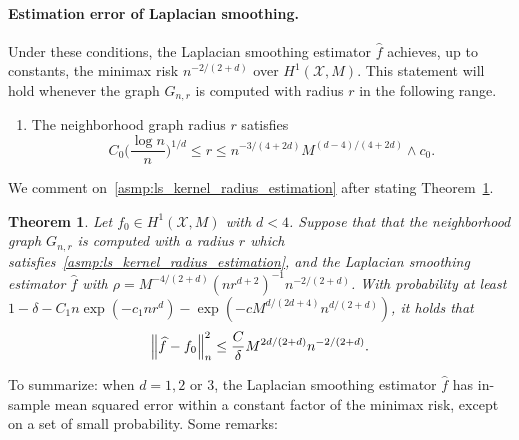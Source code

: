 \documentclass[twoside]{article}
\newcommand{\1}{\mathbf{1}}
\newcommand{\Xset}{\mathcal{X}}
\newcommand{\wh}[1]{\widehat{#1}}
\newtheorem{theorem}{Theorem}
\theoremstyle{definition}
\theoremstyle{remark}
\begin{document}
\paragraph{Estimation error of Laplacian smoothing.} 
Under these conditions, the Laplacian smoothing estimator $\wh{f}$ achieves, up to constants, the minimax risk $n^{-2/(2 + d)}$ over $H^1(\Xset,M)$. This statement will hold whenever the graph $G_{n,r}$ is computed with radius $r$ in the following range.
\begin{enumerate}[label=(R\arabic*)]
	\setcounter{enumi}{0}
	\item 
	\label{asmp:ls_kernel_radius_estimation}
	The neighborhood graph radius $r$ satisfies
	\begin{equation*}
	C_0\biggl(\frac{\log n}{n}\biggr)^{1/d} \leq r \leq n^{-3/(4 + 2d)} M^{(d - 4)/(4 + 2d)} \wedge c_0.
	\end{equation*}
\end{enumerate}
We comment on~\ref{asmp:ls_kernel_radius_estimation} after stating Theorem~\ref{thm:laplacian_smoothing_estimation1}.
\begin{theorem}
	\label{thm:laplacian_smoothing_estimation1}
	Let $f_0 \in H^1(\Xset,M)$ with $d < 4$. Suppose that that the neighborhood graph $G_{n,r}$ is computed with a radius $r$ which satisfies~\ref{asmp:ls_kernel_radius_estimation},  and the Laplacian smoothing estimator $\wh{f}$ with $\rho = M^{-4/(2 + d)} (nr^{d + 2})^{-1} n^{-2/(2 + d)}$. With probability at least $1 - \delta -  C_1n\exp(-c_1nr^d) - \exp(-c M^{d/(2d + 4)} n^{d/(2+d)})$, it holds that
	\begin{equation*}
	\Bigl\|\wh{f} - f_0\Bigr\|_n^2 \leq \frac{C}{\delta} M^{2d/(2 + d)} n^{-2/(2 + d)}.
	\end{equation*}
\end{theorem}
To summarize: when $d = 1,2$ or $3$, the Laplacian smoothing estimator $\wh{f}$ has in-sample mean squared error within a constant factor of the minimax risk, except on a set of small probability. Some remarks:
\end{document}
